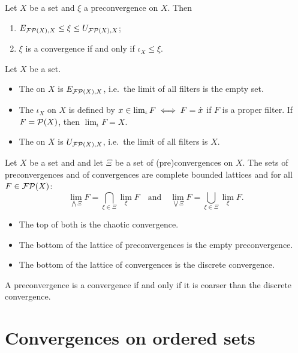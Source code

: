 \begin{lemma}
Let $X$ be a set and $\xi$ a preconvergence on $X$. Then
\begin{enumerate}
\item $E_{\operatorname{\mathcal{FP}}(X), X} \leq \xi \leq U_{\operatorname{\mathcal{FP}}(X), X}$;
\item $\xi$ is a convergence \textup{if and only if} $\iota_X \leq \xi$.
\end{enumerate}
\end{lemma}

\begin{definition}
Let $X$ be a set.
\begin{itemize}
\item The  on $X$ is $E_{\operatorname{\mathcal{FP}}(X), X}$, i.e.\ the limit of all filters is the empty set.
\item The  $\iota_X$ on $X$ is defined by $x \in \lim_\iota F \iff F = \dot{x}$ if $F$ is a proper filter. If $F = \operatorname{\mathcal{P}}(X)$, then $\lim_\iota F = X$.
\item The  on $X$ is $U_{\operatorname{\mathcal{FP}}(X), X}$, i.e.\ the limit of all filters is $X$.
\end{itemize}
\end{definition}

\begin{proposition} \label{latticeConvergences}
Let $X$ be a set and and let $\Xi$ be a set of (pre)convergences on $X$. The sets of preconvergences and of convergences are complete bounded lattices and for all $F \in \operatorname{\mathcal{FP}}(X)$:
\[ \lim_{\bigwedge \Xi} F = \bigcap_{\xi\in\Xi}\lim_\xi F \quad\text{and}\quad \lim_{\bigvee \Xi} F = \bigcup_{\xi\in\Xi}\lim_\xi F. \]
\begin{itemize}
\item The top of both is the chaotic convergence.
\item The bottom of the lattice of preconvergences is the empty preconvergence.
\item The bottom of the lattice of convergences is the discrete convergence.
\end{itemize}
\end{proposition}

\begin{lemma}
A preconvergence is a convergence \textup{if and only if} it is coarser than the discrete convergence.
\end{lemma}


\section{Convergences on ordered sets}

